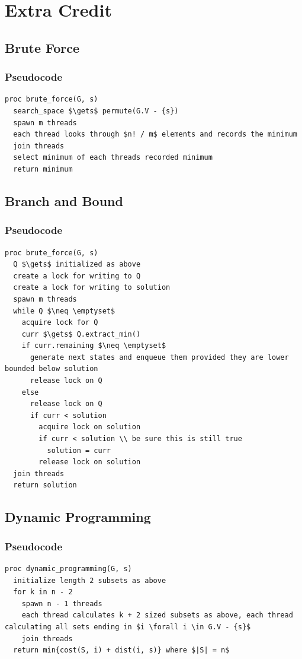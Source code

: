 \documentclass[a4paper,12pt]{article}
\begin{document}
\section{Extra Credit}
\subsection{Brute Force}
\subsubsection{Pseudocode}
\begin{lstlisting}[mathescape=true]
proc brute_force(G, s)
  search_space $\gets$ permute(G.V - {s})
  spawn m threads
  each thread looks through $n! / m$ elements and records the minimum
  join threads
  select minimum of each threads recorded minimum
  return minimum
\end{lstlisting}
\subsection{Branch and Bound}
\subsubsection{Pseudocode}
\begin{lstlisting}[mathescape=true]
proc brute_force(G, s)
  Q $\gets$ initialized as above
  create a lock for writing to Q
  create a lock for writing to solution
  spawn m threads
  while Q $\neq \emptyset$
    acquire lock for Q
    curr $\gets$ Q.extract_min()
    if curr.remaining $\neq \emptyset$
      generate next states and enqueue them provided they are lower bounded below solution
      release lock on Q
    else 
      release lock on Q
      if curr < solution
        acquire lock on solution
        if curr < solution \\ be sure this is still true
          solution = curr
        release lock on solution
  join threads
  return solution       
\end{lstlisting}
\subsection{Dynamic Programming}
\subsubsection{Pseudocode}
\begin{lstlisting}[mathescape=true]
proc dynamic_programming(G, s)
  initialize length 2 subsets as above
  for k in n - 2
    spawn n - 1 threads
    each thread calculates k + 2 sized subsets as above, each thread calculating all sets ending in $i \forall i \in G.V - {s}$
    join threads
  return min{cost(S, i) + dist(i, s)} where $|S| = n$
\end{lstlisting}
\end{document}
